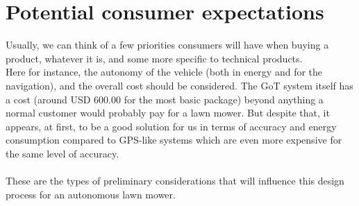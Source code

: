 \nopagebreak

\section{Potential consumer expectations}
Usually, we can think of a few priorities consumers will have when buying a product, whatever it is, and some more specific to technical products.\\
\noindent
Here for instance, the autonomy of the vehicle (both in energy and for the navigation), and the overall cost should be considered. The GoT system itself has a cost (around USD 600.00 for the most basic package) beyond anything a normal customer would probably pay for a lawn mower. But despite that, it appears, at first, to be a good solution for us in terms of accuracy and energy consumption compared to GPS-like systems which are even more expensive for the same level of accuracy. \\\\
\noindent
These are the types of preliminary considerations that will influence this design process for an autonomous lawn mower.

\nopagebreak